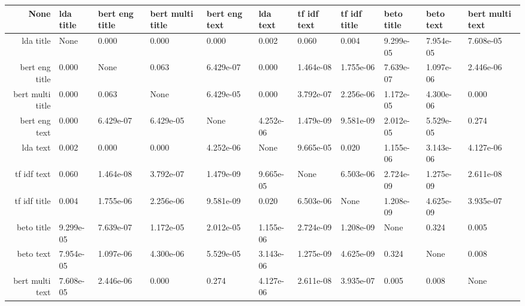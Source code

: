 \begin{tabular}{|r|l|l|l|l|l|l|l|l|l|l|}
  \hline
  None & lda title & bert eng title & bert multi title & bert eng text & lda text & tf idf text & tf idf title & beto title & beto text & bert multi text \\ 
  \hline
  lda title & None & 0.000 & 0.000 & 0.000 & 0.002 & 0.060 & 0.004 & 9.299e-05 & 7.954e-05 & 7.608e-05 \\ 
  \hline
  bert eng title & 0.000 & None & 0.063 & 6.429e-07 & 0.000 & 1.464e-08 & 1.755e-06 & 7.639e-07 & 1.097e-06 & 2.446e-06 \\ 
  \hline
  bert multi title & 0.000 & 0.063 & None & 6.429e-05 & 0.000 & 3.792e-07 & 2.256e-06 & 1.172e-05 & 4.300e-06 & 0.000 \\ 
  \hline
  bert eng text & 0.000 & 6.429e-07 & 6.429e-05 & None & 4.252e-06 & 1.479e-09 & 9.581e-09 & 2.012e-05 & 5.529e-05 & 0.274 \\ 
  \hline
  lda text & 0.002 & 0.000 & 0.000 & 4.252e-06 & None & 9.665e-05 & 0.020 & 1.155e-06 & 3.143e-06 & 4.127e-06 \\ 
  \hline
  tf idf text & 0.060 & 1.464e-08 & 3.792e-07 & 1.479e-09 & 9.665e-05 & None & 6.503e-06 & 2.724e-09 & 1.275e-09 & 2.611e-08 \\ 
  \hline
  tf idf title & 0.004 & 1.755e-06 & 2.256e-06 & 9.581e-09 & 0.020 & 6.503e-06 & None & 1.208e-09 & 4.625e-09 & 3.935e-07 \\ 
  \hline
  beto title & 9.299e-05 & 7.639e-07 & 1.172e-05 & 2.012e-05 & 1.155e-06 & 2.724e-09 & 1.208e-09 & None & 0.324 & 0.005 \\ 
  \hline
  beto text & 7.954e-05 & 1.097e-06 & 4.300e-06 & 5.529e-05 & 3.143e-06 & 1.275e-09 & 4.625e-09 & 0.324 & None & 0.008 \\ 
  \hline
  bert multi text & 7.608e-05 & 2.446e-06 & 0.000 & 0.274 & 4.127e-06 & 2.611e-08 & 3.935e-07 & 0.005 & 0.008 & None \\ 
  \hline
\end{tabular}
